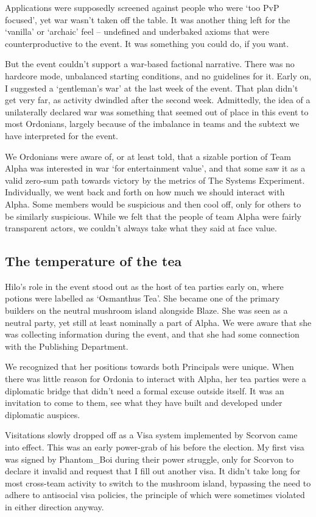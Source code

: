 Applications were supposedly screened against people who were `too PvP focused', yet war wasn't taken off the table. It was another thing left for the `vanilla' or `archaic' feel – undefined and underbaked axioms that were counterproductive to the event. It was something you could do, if you want.

But the event couldn't support a war-based factional narrative. There was no hardcore mode, unbalanced starting conditions, and no guidelines for it. Early on, I suggested a `gentleman's war' at the last week of the event. That plan didn't get very far, as activity dwindled after the second week. Admittedly, the idea of a unilaterally declared war was something that seemed out of place in this event to most Ordonians, largely because of the imbalance in teams and the subtext we have interpreted for the event.

We Ordonians were aware of, or at least told, that a sizable portion of Team Alpha was interested in war `for entertainment value', and that some saw it as a valid zero-sum path towards victory by the metrics of The Systems Experiment. Individually, we went back and forth on how much we should interact with Alpha. Some members would be suspicious and then cool off, only for others to be similarly suspicious. While we felt that the people of team Alpha were fairly transparent actors, we couldn't always take what they said at face value.

\subsection{The temperature of the tea}
Hilo's role in the event stood out as the host of tea parties early on, where potions were labelled as `Osmanthus Tea'. She became one of the primary builders on the neutral mushroom island alongside Blaze. She was seen as a neutral party, yet still at least nominally a part of Alpha. We were aware that she was collecting information during the event, and that she had some connection with the Publishing Department.

We recognized that her positions towards both Principals were unique. When there was little reason for Ordonia to interact with Alpha, her tea parties were a diplomatic bridge that didn't need a formal excuse outside itself. It was an invitation to come to them, see what they have built and developed under diplomatic auspices.

Visitations slowly dropped off as a Visa system implemented by Scorvon came into effect. This was an early power-grab of his before the election. My first visa was signed by Phantom\_Boi during their power struggle, only for Scorvon to declare it invalid and request that I fill out another visa. It didn't take long for most cross-team activity to switch to the mushroom island, bypassing the need to adhere to antisocial visa policies, the principle of which were sometimes violated in either direction anyway.

